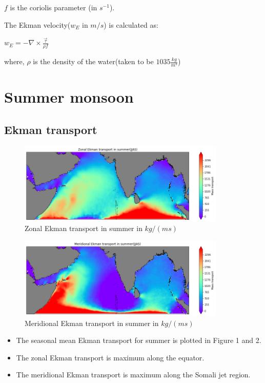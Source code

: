 \documentclass[20pt]{article}
\begin{document}
$f$ is the coriolis parameter (in $s^{-1}$). 

The Ekman velocity($w_{E}$ in $m/s$) is calculated as:
\begin{center}
    $w_{E} = - \nabla\times\frac{\vec{\tau}}{\rho f}$
\end{center}

where,
$\rho$ is the density of the water(taken to be $1035 \frac{kg}{m^{3}}$)

\section*{Summer monsoon}

\subsection*{Ekman transport}

\begin{figure}
    \centering
    \includegraphics[width=0.88\textwidth]{summer_zonal_trans.png}
    \caption{Zonal Ekman transport in summer in $kg/(m s)$}
\end{figure}

\begin{figure}
    \centering
    \includegraphics[width=0.88\textwidth]{summer_meridional_trans.png}
    \caption{Meridional Ekman transport in summer in $kg/(m s)$}
\end{figure}

\begin{itemize}
    \item The seasonal mean Ekman transport for summer is plotted in Figure 1 and 2. 
    \item The zonal Ekman transport is maximum along the equator.
    \item The meridional Ekman transport is maximum along the Somali jet region.
\end{itemize}
\end{document}
